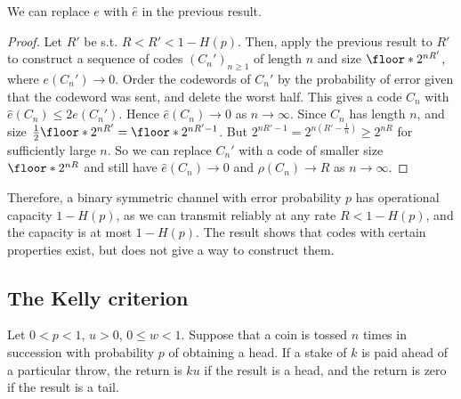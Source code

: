 \begin{proposition}
    We can replace $e$ with $\hat e$ in the previous result.
\end{proposition}

\begin{proof}
    Let $R'$ be s.t. $R < R' < 1 - H(p)$.
    Then, apply the previous result to $R'$ to construct a sequence of codes $(C_n')_{n \geq 1}$ of length $n$ and size $\floor*{2^{nR'}}$, where $e(C_n') \to 0$.
    Order the codewords of $C_n'$ by the probability of error given that the codeword was sent, and delete the worst half.
    This gives a code $C_n$ with $\hat e(C_n) \leq 2 e(C_n')$.
    Hence $\hat e(C_n) \to 0$ as $n \to \infty$.
    Since $C_n$ has length $n$, and size $\frac{1}{2} \floor*{2^{nR'}} = \floor*{2^{nR' - 1}}$.
    But $2^{nR' - 1} = 2^{n(R' - \frac{1}{n})} \geq 2^{nR}$ for sufficiently large $n$.
    So we can replace $C_n'$ with a code of smaller size $\floor*{2^{nR}}$ and still have $\hat e(C_n) \to 0$ and $\rho(C_n) \to R$ as $n \to \infty$.
\end{proof}

Therefore, a binary symmetric channel with error probability $p$ has operational capacity $1 - H(p)$, as we can transmit reliably at any rate $R < 1 - H(p)$, and the capacity is at most $1 - H(p)$.
The result shows that codes with certain properties exist, but does not give a way to construct them.

\subsection{The Kelly criterion}
Let $0 < p < 1$, $u > 0$, $0 \leq w < 1$.
Suppose that a coin is tossed $n$ times in succession with probability $p$ of obtaining a head.
If a stake of $k$ is paid ahead of a particular throw, the return is $ku$ if the result is a head, and the return is zero if the result is a tail.

